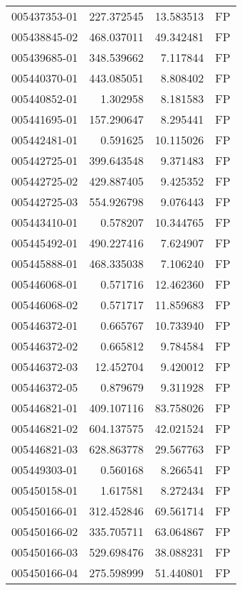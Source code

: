 \begin{tabular}{lrrl}
005437353-01 &  227.372545 &      13.583513 &   FP \\
005438845-02 &  468.037011 &      49.342481 &   FP \\
005439685-01 &  348.539662 &       7.117844 &   FP \\
005440370-01 &  443.085051 &       8.808402 &   FP \\
005440852-01 &    1.302958 &       8.181583 &   FP \\
005441695-01 &  157.290647 &       8.295441 &   FP \\
005442481-01 &    0.591625 &      10.115026 &   FP \\
005442725-01 &  399.643548 &       9.371483 &   FP \\
005442725-02 &  429.887405 &       9.425352 &   FP \\
005442725-03 &  554.926798 &       9.076443 &   FP \\
005443410-01 &    0.578207 &      10.344765 &   FP \\
005445492-01 &  490.227416 &       7.624907 &   FP \\
005445888-01 &  468.335038 &       7.106240 &   FP \\
005446068-01 &    0.571716 &      12.462360 &   FP \\
005446068-02 &    0.571717 &      11.859683 &   FP \\
005446372-01 &    0.665767 &      10.733940 &   FP \\
005446372-02 &    0.665812 &       9.784584 &   FP \\
005446372-03 &   12.452704 &       9.420012 &   FP \\
005446372-05 &    0.879679 &       9.311928 &   FP \\
005446821-01 &  409.107116 &      83.758026 &   FP \\
005446821-02 &  604.137575 &      42.021524 &   FP \\
005446821-03 &  628.863778 &      29.567763 &   FP \\
005449303-01 &    0.560168 &       8.266541 &   FP \\
005450158-01 &    1.617581 &       8.272434 &   FP \\
005450166-01 &  312.452846 &      69.561714 &   FP \\
005450166-02 &  335.705711 &      63.064867 &   FP \\
005450166-03 &  529.698476 &      38.088231 &   FP \\
005450166-04 &  275.598999 &      51.440801 &   FP \\

\end{tabular}
